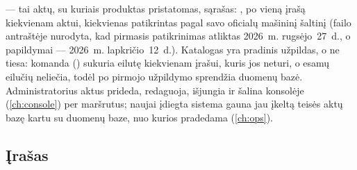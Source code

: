  --- tai aktų, su kuriais produktas pristatomas, sąrašas:
, po vieną įrašą kiekvienam aktui, kiekvienas patikrintas pagal savo
oficialų mašininį šaltinį (failo antraštėje nurodyta, kad pirmasis patikrinimas atliktas
2026~m. rugsėjo~27~d., o papildymai --- 2026~m. lapkričio~12~d.). Katalogas yra pradinis
užpildas, o ne tiesa: komanda 
() sukuria  eilutę
kiekvienam įrašui, kuris jos neturi, o esamų eilučių neliečia, todėl po pirmojo užpildymo
sprendžia duomenų bazė. Administratorius aktus prideda, redaguoja, išjungia ir šalina konsolėje
(\cref{ch:console}) per  maršrutus; naujai įdiegta sistema gauna jau
įkeltą teisės aktų bazę kartu su duomenų baze, nuo kurios pradedama (\cref{ch:ops}).

\subsection{Įrašas}\label{sec:corpus:entry}

